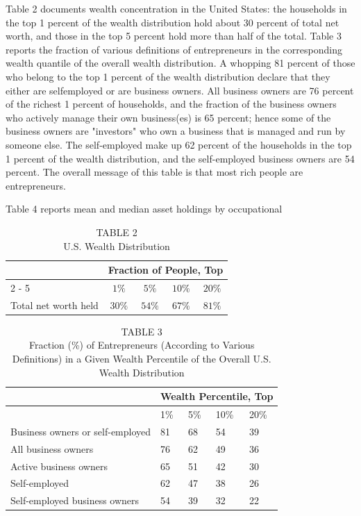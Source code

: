 \documentclass[10pt]{article}
\begin{document}
Table 2 documents wealth concentration in the United States: the households in the top 1 percent of the wealth distribution hold about 30 percent of total net worth, and those in the top 5 percent hold more than half of the total. Table 3 reports the fraction of various definitions of entrepreneurs in the corresponding wealth quantile of the overall wealth distribution. A whopping 81 percent of those who belong to the top 1 percent of the wealth distribution declare that they either are selfemployed or are business owners. All business owners are 76 percent of the richest 1 percent of households, and the fraction of the business owners who actively manage their own business(es) is 65 percent; hence some of the business owners are "investors" who own a business that is managed and run by someone else. The self-employed make up 62 percent of the households in the top 1 percent of the wealth distribution, and the self-employed business owners are 54 percent. The overall message of this table is that most rich people are entrepreneurs.

Table 4 reports mean and median asset holdings by occupational

\begin{table}[h]
\begin{center}
\captionsetup{labelformat=empty}
\caption{TABLE 2\\
U.S. Wealth Distribution}
\begin{tabular}{lcccc}
\hline\hline
 & \multicolumn{4}{c}{Fraction of People, Top} \\
\cline { 2 - 5 }
 & $1 \%$ & $5 \%$ & $10 \%$ & $20 \%$ \\
\hline
Total net worth held & $30 \%$ & $54 \%$ & $67 \%$ & $81 \%$ \\
\hline
\end{tabular}
\end{center}
\end{table}

\begin{table}[h]
\begin{center}
\captionsetup{labelformat=empty}
\caption{TABLE 3\\
Fraction (\%) of Entrepreneurs (According to Various Definitions) in a Given Wealth Percentile of the Overall U.S. Wealth Distribution}
\begin{tabular}{|l|l|l|l|l|}
\hline
\multirow{2}{*}{} & \multicolumn{4}{|c|}{Wealth Percentile, Top} \\
\hline
 & 1\% & 5\% & 10\% & 20\% \\
\hline
Business owners or self-employed & 81 & 68 & 54 & 39 \\
\hline
All business owners & 76 & 62 & 49 & 36 \\
\hline
Active business owners & 65 & 51 & 42 & 30 \\
\hline
Self-employed & 62 & 47 & 38 & 26 \\
\hline
Self-employed business owners & 54 & 39 & 32 & 22 \\
\hline
\end{tabular}
\end{center}
\end{table}
\end{document}
